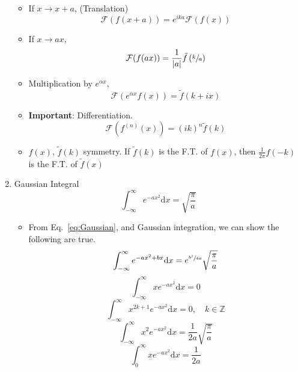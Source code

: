 \documentclass{article}
\begin{document}
\begin{enumerate}
\begin{itemize}
\begin{equation}
\end{equation}
\item If $x\rightarrow x+a$, (Translation)
\begin{equation}
\mathcal{F}(f(x+a))=e^{ika}\mathcal{F}(f(x))
\end{equation}
\item If $x\rightarrow ax$,
\begin{equation}
\mathcal{F}(f(ax))=\frac{1}{|a|} \tilde{f}\left(\sfrac{k}{a}\right)
\end{equation}
\item Multiplication by $e^{\alpha x}$,
\begin{equation}
\mathcal{F}(e^{\alpha x}f(x))=\tilde{f}(k+ix)
\end{equation}
\item \textbf{Important}: Differentiation.
\begin{equation}
\mathcal{F}(f^{(n)}(x))=(ik)^n\tilde{f}(k)
\label{FTdiff}
\end{equation}
\item $f(x)$, $\tilde{f}(k)$ symmetry. If $\tilde{f}(k)$ is the F.T. of $f(x)$, then $\frac{1}{2\pi}f(-k)$ is the F.T. of $\tilde{f}(x)$
\end{itemize}
\item Gaussian Integral
\begin{equation}
\int_{-\infty}^{\infty}e^{-ax^2}\mathrm{d}x = \sqrt{\frac{\pi}{a}}
\label{eq:Gaussian}
\end{equation}
\begin{itemize}
\item From Eq.~\ref{eq:Gaussian}, and Gaussian integration, we can show the following are true.
\begin{equation}
\int_{-\infty}^{\infty}e^{-ax^2+bx}\mathrm{d}x = e^{\sfrac{b^2}{4a}}\sqrt{\frac{\pi}{a}}
\end{equation}
\begin{equation}
\int_{-\infty}^{\infty}xe^{-ax^2}\mathrm{d}x = 0
\end{equation}
\begin{equation}
\int_{-\infty}^{\infty}x^{2k+1}e^{-ax^2}\mathrm{d}x = 0,\quad k\in\mathbb{Z}
\end{equation}
\begin{equation}
\int_{-\infty}^{\infty}x^2e^{-ax^2}\mathrm{d}x =\frac{1}{2a}\sqrt{\frac{\pi}{a}}
\end{equation}
\begin{equation}
\int_{0}^{\infty}xe^{-ax^2}\mathrm{d}x = \frac{1}{2a}
\end{equation}

\end{itemize}
\end{enumerate}
\end{document}
